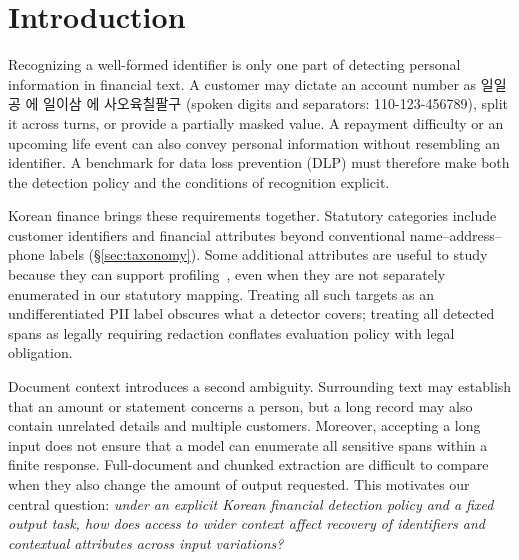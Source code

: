 \section{Introduction}
\label{sec:intro}



Recognizing a well-formed identifier is only one part of detecting personal information in financial text. A customer may dictate an account number as \textup{일일공 에 일이삼 에 사오육칠팔구} (spoken digits and separators: 110-123-456789), split it across turns, or provide a partially masked value. A repayment difficulty or an upcoming life event can also convey personal information without resembling an identifier. A benchmark for data loss prevention (DLP) must therefore make both the detection policy and the conditions of recognition explicit.

Korean finance brings these requirements together. Statutory categories include customer identifiers and financial attributes beyond conventional name--address--phone labels (\S\ref{sec:taxonomy}). Some additional attributes are useful to study because they can support profiling~\cite{staab2024beyond}, even when they are not separately enumerated in our statutory mapping. Treating all such targets as an undifferentiated PII label obscures what a detector covers; treating all detected spans as legally requiring redaction conflates evaluation policy with legal obligation.

Document context introduces a second ambiguity. Surrounding text may establish that an amount or statement concerns a person, but a long record may also contain unrelated details and multiple customers. Moreover, accepting a long input does not ensure that a model can enumerate all sensitive spans within a finite response. Full-document and chunked extraction are difficult to compare when they also change the amount of output requested. This motivates our central question: \emph{under an explicit Korean financial detection policy and a fixed output task, how does access to wider context affect recovery of identifiers and contextual attributes across input variations?}

